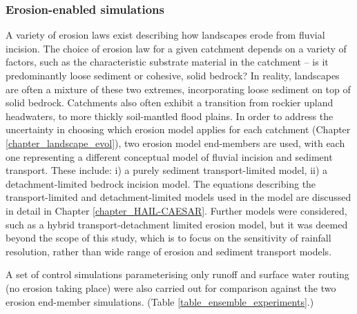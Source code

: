 \subsubsection{Erosion-enabled simulations}
A variety of erosion laws exist describing how landscapes erode from fluvial incision. The choice of erosion law for a given catchment depends on a variety of factors, such as the characteristic substrate material in the catchment -- is it predominantly loose sediment or cohesive, solid bedrock? In reality, landscapes are often a mixture of these two extremes, incorporating loose sediment on top of solid bedrock. Catchments also often exhibit a transition from rockier upland headwaters, to more thickly soil-mantled flood plains. In order to address the uncertainty in choosing which erosion model applies for each catchment (Chapter \ref{chapter_landscape_evol}), two erosion model end-members are used, with each one representing a different conceptual model of fluvial incision and sediment transport. These include: i) a purely sediment transport-limited model, ii) a detachment-limited bedrock incision model. The equations describing the transport-limited and detachment-limited models used in the model are discussed in detail in Chapter \ref{chapter_HAIL-CAESAR}. Further models were considered, such as a hybrid transport-detachment limited erosion model, but it was deemed beyond the scope of this study, which is to focus on the sensitivity of rainfall resolution, rather than wide range of erosion and sediment transport models. 

A set of control simulations parameterising only runoff and surface water routing (no erosion taking place) were also carried out for comparison against the two erosion end-member simulations. (Table \ref{table_ensemble_experiments}.)


